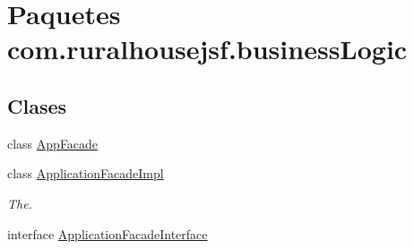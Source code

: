 \hypertarget{namespacecom_1_1ruralhousejsf_1_1business_logic}{}\section{Paquetes com.\+ruralhousejsf.\+business\+Logic}
\label{namespacecom_1_1ruralhousejsf_1_1business_logic}
\subsection*{Clases}
\begin{DoxyCompactItemize}
\item 
class \mbox{\hyperlink{classcom_1_1ruralhousejsf_1_1business_logic_1_1_app_facade}{App\+Facade}}
\item 
class \mbox{\hyperlink{classcom_1_1ruralhousejsf_1_1business_logic_1_1_application_facade_impl}{Application\+Facade\+Impl}}
\begin{DoxyCompactList}\small\item\em The. \end{DoxyCompactList}\item 
interface \mbox{\hyperlink{interfacecom_1_1ruralhousejsf_1_1business_logic_1_1_application_facade_interface}{Application\+Facade\+Interface}}
\end{DoxyCompactItemize}
